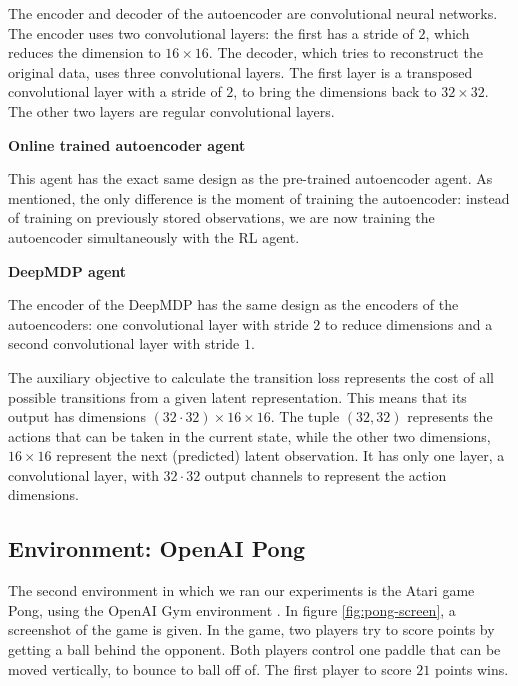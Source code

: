 The encoder and decoder of the autoencoder are convolutional neural networks. The encoder uses two convolutional layers: the first has a stride of $2$, which reduces the dimension to $16 \times 16$. The decoder, which tries to reconstruct the original data, uses three convolutional layers. The first layer is a transposed convolutional layer with a stride of $2$, to bring the dimensions back to $32 \times 32$. The other two layers are regular convolutional layers. \newline\par
 
\noindent \textbf{Online trained autoencoder agent} \par
\noindent  This agent has the exact same design as the pre-trained autoencoder agent. As mentioned, the only difference is the moment of training the autoencoder: instead of training on previously stored observations, we are now training the autoencoder simultaneously with the RL agent. \newline\par

\noindent \textbf{DeepMDP agent}\par
\noindent The encoder of the DeepMDP has the same design as the encoders of the autoencoders: one convolutional layer with stride $2$ to reduce dimensions and a second convolutional layer with stride $1$. 

The auxiliary objective to calculate the transition loss represents the cost of all possible transitions from a given latent representation. This means that its output has dimensions $(32 \cdot 32) \times 16 \times 16$. The tuple $(32, 32)$ represents the actions that can be taken in the current state, while the other two dimensions, $16 \times 16$ represent the next (predicted) latent observation. It has only one layer, a convolutional layer, with $32 \cdot 32$ output channels to represent the action dimensions.

\subsection{Environment: OpenAI Pong}\label{research-env-pong}
The second environment in which we ran our experiments is the Atari game Pong, using the OpenAI Gym environment \cite{pong}. In figure \ref{fig:pong-screen}, a screenshot of the game is given. In the game, two players try to score points by getting a ball behind the opponent. Both players control one paddle that can be moved vertically, to bounce to ball off of. The first player to score $21$ points wins.

